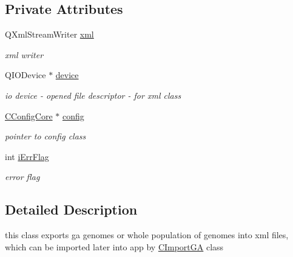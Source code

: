 \subsection*{Private Attributes}
\begin{DoxyCompactItemize}
\item 
\hypertarget{classCExportGA_a578c393d6e595413da10b0b1a6aff45d}{
QXmlStreamWriter \hyperlink{classCExportGA_a578c393d6e595413da10b0b1a6aff45d}{xml}}
\label{classCExportGA_a578c393d6e595413da10b0b1a6aff45d}

\begin{DoxyCompactList}\small\item\em xml writer \item\end{DoxyCompactList}\item 
\hypertarget{classCExportGA_a89a558515aefb9ca36180116bf76e04d}{
QIODevice $\ast$ \hyperlink{classCExportGA_a89a558515aefb9ca36180116bf76e04d}{device}}
\label{classCExportGA_a89a558515aefb9ca36180116bf76e04d}

\begin{DoxyCompactList}\small\item\em io device -\/ opened file descriptor -\/ for xml class \item\end{DoxyCompactList}\item 
\hypertarget{classCExportGA_aec9b1757260fd9c035b9f0f0ef311991}{
\hyperlink{classCConfigCore}{CConfigCore} $\ast$ \hyperlink{classCExportGA_aec9b1757260fd9c035b9f0f0ef311991}{config}}
\label{classCExportGA_aec9b1757260fd9c035b9f0f0ef311991}

\begin{DoxyCompactList}\small\item\em pointer to config class \item\end{DoxyCompactList}\item 
\hypertarget{classCExportGA_a8b1256553939c48d7d2251e4c7819571}{
int \hyperlink{classCExportGA_a8b1256553939c48d7d2251e4c7819571}{iErrFlag}}
\label{classCExportGA_a8b1256553939c48d7d2251e4c7819571}

\begin{DoxyCompactList}\small\item\em error flag \item\end{DoxyCompactList}\end{DoxyCompactItemize}


\subsection{Detailed Description}
this class exports ga genomes or whole population of genomes into xml files, which can be imported later into app by \hyperlink{classCImportGA}{CImportGA} class 

